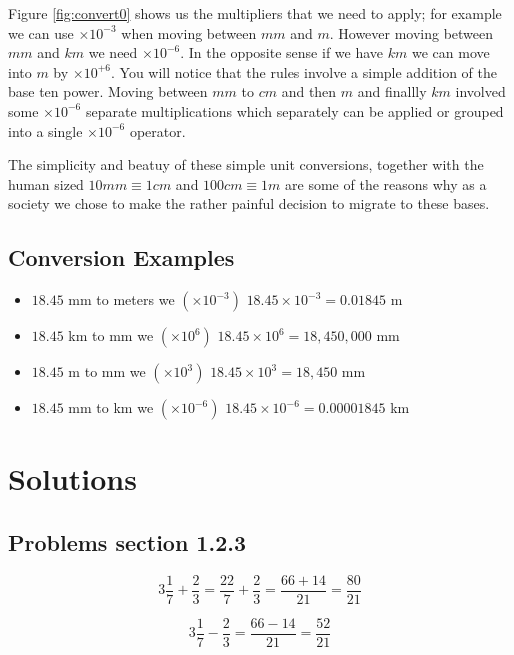Figure \ref{fig:convert0} shows us the multipliers that we need to apply; for example we can use $ \times 10^{-3}$ when moving between $mm$ and $m$. However moving between $mm$ and $km$ we need $ \times 10^{-6}$. In the opposite sense if we have $km$ we can move into $m$ by $ \times 10^{+6}$. You will notice that the rules involve a simple addition of the base ten power. Moving between $mm$ to $cm$ and then $m$ and finallly $km$ involved some $ \times 10^{-6}$ separate multiplications which separately can be applied or grouped into a single $ \times 10^{-6}$ operator. 

The simplicity and beatuy of these simple unit conversions, together with the human sized $ 10mm \equiv 1 cm $ and $ 100cm \equiv 1m $ are some of the reasons why as a society we chose to make the rather painful decision to migrate to these bases.

\subsection{Conversion Examples}

\begin{itemize}
  \item \eg $18.45$ mm to meters we $(\times 10^{-3}) $ $18.45 \times 10^{-3} = 0.01845$ m
  \item \eg $18.45$ km to mm we $(\times 10^{6}) $ $18.45 \times 10^{6} = 18,450,000$ mm
  \item \eg $18.45$ m to mm we $(\times 10^{3}) $ $18.45 \times 10^{3} = 18,450 $ mm
  \item \eg $18.45$ mm to km we $(\times 10^{-6}) $ $18.45 \times 10^{-6} = 0.00001845$ km
\end{itemize}

\section{Solutions}

\subsection{Problems section 1.2.3}

\begin{equation}
  3\frac{1}{7} + \frac{2}{3} = \frac{22}{7} + \frac{2}{3} = \frac{66 + 14}{21} = \frac{80}{21}
\end{equation}

\begin{equation}
  3\frac{1}{7} - \frac{2}{3} = \frac{66 - 14}{21} = \frac{52}{21}
\end{equation}


